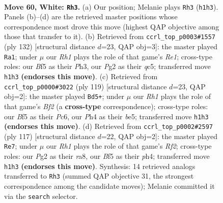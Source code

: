 \documentclass[11pt]{article}
\begin{document}
\clearpage

\begin{figure}[p]\centering
\begin{subfigure}{0.46\textwidth}\centering
\resizebox{\linewidth}{!}{%
\newchessgame
\chessboard[
  setfen={8/6k1/4Q3/5B2/7P/8/1p4P1/6KR w - - 1 60},
  showmover=false,
  pgfstyle=straightmove, color=movearrow, markmove={h1-h3}
]}
\caption{}
\end{subfigure}\hfill
\begin{subfigure}{0.46\textwidth}\centering
\resizebox{\linewidth}{!}{%
\newchessgame
\chessboard[
  setfen={8/8/8/2q5/8/3k3P/6P1/4RK2 w - - 26 67},
  showmover=false,
  pgfstyle=straightmove, color=movearrow, markmove={e1-a1}
]}
\caption{}
\end{subfigure}
\\[4pt]
\begin{subfigure}{0.46\textwidth}\centering
\resizebox{\linewidth}{!}{%
\newchessgame
\chessboard[
  setfen={6k1/5b1p/2p5/2P1B3/8/5K1P/8/8 b - - 0 60},
  showmover=false,
  pgfstyle=straightmove, color=movearrow, markmove={f7-d5}
]}
\caption{}
\end{subfigure}\hfill
\begin{subfigure}{0.46\textwidth}\centering
\resizebox{\linewidth}{!}{%
\newchessgame
\chessboard[
  setfen={R7/5rk1/6p1/8/7P/8/8/6K1 b - - 6 59},
  showmover=false,
  pgfstyle=straightmove, color=movearrow, markmove={f7-e7}
]}
\caption{}
\end{subfigure}
\caption{\textbf{Move 60, White: \texttt{Rh3}.} (a) Our position; Melanie plays \texttt{Rh3} (\texttt{h1h3}). Panels (b)--(d) are the retrieved master positions whose correspondence most drove this move (highest QAP objective among those that transfer to it). (b) Retrieved from \texttt{ccrl\_top\_p0003\#1557} (ply 132) [structural distance $d$=23, QAP obj=3]: the master played \texttt{Ra1}; under $\mu$ our \emph{Rh1} plays the role of that game's \emph{Re1}; cross-type roles: our \emph{B}f5 as their \emph{P}h3, our \emph{P}g2 as their \emph{q}c5; transferred move \texttt{h1h3} \textbf{(endorses this move)}. (c) Retrieved from \texttt{ccrl\_top\_p0000\#3022} (ply 119) [structural distance $d$=23, QAP obj=2]: the master played \texttt{Bd5+}; under $\mu$ our \emph{Rh1} plays the role of that game's \emph{Bf2} (a \textbf{cross-type} correspondence); cross-type roles: our \emph{B}f5 as their \emph{P}c6, our \emph{P}h4 as their \emph{b}e5; transferred move \texttt{h1h3} \textbf{(endorses this move)}. (d) Retrieved from \texttt{ccrl\_top\_p0002\#2597} (ply 117) [structural distance $d$=22, QAP obj=2]: the master played \texttt{Re7}; under $\mu$ our \emph{Rh1} plays the role of that game's \emph{Rf2}; cross-type roles: our \emph{P}g2 as their \emph{r}a8, our \emph{B}f5 as their \emph{p}h4; transferred move \texttt{h1h3} \textbf{(endorses this move)}. Synthesis: 14 retrieved analogs transferred to \texttt{Rh3} (summed QAP objective 31, the strongest correspondence among the candidate moves); Melanie committed it via the \texttt{search} selector.}
\label{fig:thought-m118}
\end{figure}
\end{document}
